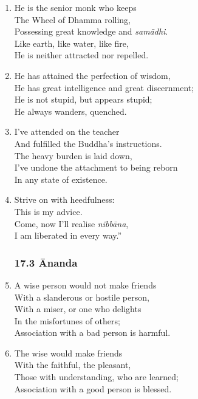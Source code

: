 \documentclass[10pt, openany]{book}
\newcommand*{\vleftofline}[1]{\leavevmode\llap{#1}}
\begin{document}
\begin{enumerate}
\item He is the senior monk who keeps \\
The Wheel of Dhamma rolling,\\
Possessing great knowledge and \emph{samādhi}.\\
Like earth, like water, like fire,\\
He is neither attracted nor repelled.

\item He has attained the perfection of wisdom,\\
He has great intelligence and great discernment;\\
He is not stupid, but appears stupid;\\
He always wanders, quenched.

\item I’ve attended on the teacher\\
And fulfilled the Buddha’s instructions.\\
The heavy burden is laid down,\\
I’ve undone the attachment to being reborn \\
In any state of existence.

\item Strive on with heedfulness:\\
This is my advice.\\
Come, now I’ll realise \emph{nibbāna},\\
I am liberated in every way.”

\subsubsection*{17.3 Ānanda}

\item \vleftofline{“}A wise person would not make friends\\
With a slanderous or hostile person,\\
With a miser, or one who delights \\
In the misfortunes of others;\\
Association with a bad person is harmful.

\item The wise would make friends \\
With the faithful, the pleasant,\\
Those with understanding, who are learned;\\
Association with a good person is blessed.


\end{enumerate}
\end{document}
